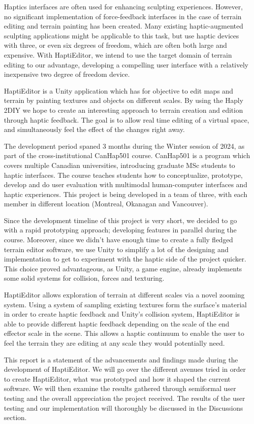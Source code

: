 Haptics interfaces are often used for enhancing sculpting experiences.
However, no significant implementation of force-feedback interfaces in the case of terrain editing and terrain painting has been created.
Many existing haptic-augmented sculpting applications might be applicable to this task, but use haptic devices with three, or even six degrees of freedom, which are often both large and expensive.
With HaptiEditor, we intend to use the target domain of terrain editing to our advantage, developing a compelling user interface with a relatively inexpensive two degree of freedom device.

HaptiEditor is a Unity application which has for objective to edit maps and terrain by painting textures and objects on different scales. 
By using the Haply 2DIY we hope to create an interesting approach to terrain creation and edition through haptic feedback.
The goal is to allow real time editing of a virtual space, and simultaneously feel the effect of the changes right away.

The development period spaned 3 months during the Winter session of 2024, as part of the cross-institutional CanHap501 course.
CanHap501 is a program which covers multiple Canadian universities, introducing graduate MSc students to haptic interfaces. 
The course teaches students how to conceptualize, prototype, develop and do user evaluation with multimodal human-computer interfaces and haptic experiences.
This project is being developed in a team of three, with each member in different location (Montreal, Okanagan and Vancouver).

Since the development timeline of this project is very short, we decided to go with a rapid prototyping approach; developing features in parallel during the course.
Moreover, since we didn't have enough time to create a fully fledged terrain editor software,
we use Unity to simplify a lot of the designing and implementation to get to experiment with the haptic side of the project quicker.
This choice proved advantageous, as Unity, a game engine, already implements some solid systems for collision, forces and texturing.

HaptiEditor allows exploration of terrain at different scales via a novel zooming system.
Using a system of sampling existing textures form the surface's material in order to create haptic feedback and Unity's collision system, HaptiEditor is able to provide different haptic feedback depending on the scale of the end effector scale in the scene.
This allows a haptic continuum to enable the user to feel the terrain they are editing at any scale they would potentially need.

This report is a statement of the advancements and findings made during the development of HaptiEditor. 
We will go over the different avenues tried in order to create HaptiEditor, what was prototyped and how it shaped the current software. 
We will then examine the results gathered through semiformal user testing and the overall appreciation the project received. 
The results of the user testing and our implementation will thoroughly be discussed in the Discussions section.
